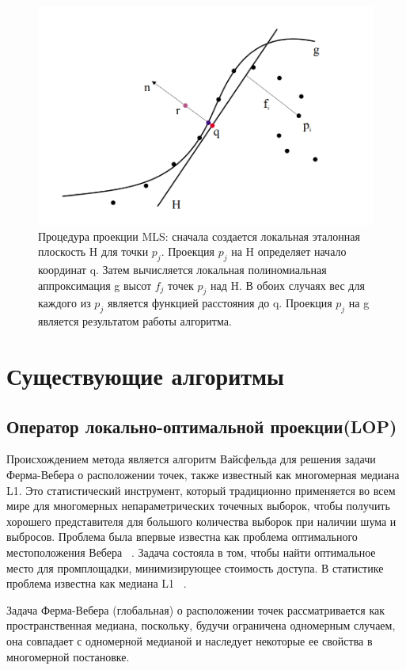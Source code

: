 \begin{figure}[h]
    \centering
    \includegraphics[scale=0.5]{images/0.png}
    \caption{Процедура проекции MLS: сначала создается локальная эталонная плоскость H для точки $p_j$. Проекция $p_j$ на H определяет начало координат q. Затем вычисляется локальная полиномиальная аппроксимация g высот $f_j$ точек $p_j$ над H. В обоих случаях вес для каждого из $p_j$ является функцией расстояния до q. Проекция $p_j$ на g является результатом работы алгоритма.}
    \label{fig:0}
\end{figure}


\section{Существующие алгоритмы}
\subsection{Оператор локально-оптимальной проекции(LOP)}
Происхождением метода является алгоритм Вайсфельда для решения задачи Ферма-Вебера о расположении точек, также известный как многомерная медиана L1. Это статистический инструмент, который традиционно применяется во всем мире для многомерных непараметрических точечных выборок, чтобы получить хорошего представителя для большого количества выборок при наличии шума и выбросов. Проблема была впервые известна как проблема оптимального местоположения Вебера ~\cite{WEBER}. Задача состояла в том, чтобы найти оптимальное место для промплощадки, минимизирующее стоимость доступа. В статистике проблема известна как медиана L1 ~\cite{BROWN, SMALL}.

Задача Ферма-Вебера (глобальная) о расположении точек рассматривается как пространственная медиана, поскольку, будучи ограничена одномерным случаем, она совпадает с одномерной медианой и наследует некоторые ее свойства в многомерной постановке.

